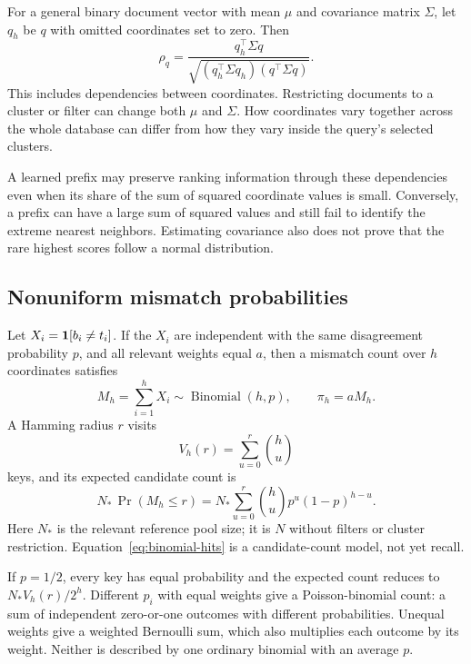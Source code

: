For a general binary document vector with mean $\mu$ and covariance matrix $\Sigma$, let
$q_h$ be $q$ with omitted coordinates set to zero. Then
\begin{equation}
\rho_q=\frac{q_h^\top\Sigma q}
 {\sqrt{(q_h^\top\Sigma q_h)(q^\top\Sigma q)}}.
\label{eq:rho-covariance}
\end{equation}
This includes dependencies between coordinates. Restricting documents to a cluster or filter can
change both $\mu$ and $\Sigma$. How coordinates vary together across the whole database can differ from how they vary
inside the query's selected clusters.

A learned prefix may preserve ranking information through these dependencies even when its
share of the sum of squared coordinate values is small. Conversely, a prefix can have a large sum of squared values and
still fail to identify the extreme nearest neighbors. Estimating covariance also does not
prove that the rare highest scores follow a normal distribution.

\subsection{Nonuniform mismatch probabilities}
Let $X_i=\mathbf 1[b_i\ne t_i]$. If the $X_i$ are independent with the same disagreement probability
$p$, and all relevant weights equal $a$, then a mismatch count over $h$ coordinates satisfies
\begin{equation}
M_h=\sum_{i=1}^{h}X_i\sim\operatorname{Binomial}(h,p),\qquad
\pi_h=aM_h.
\label{eq:binomial}
\end{equation}
A Hamming radius $r$ visits
\begin{equation}
V_h(r)=\sum_{u=0}^{r}\binom{h}{u}
\label{eq:hamming-volume}
\end{equation}
keys, and its expected candidate count is
\begin{equation}
N_*\,\Pr(M_h\leq r)
=N_*\sum_{u=0}^{r}\binom{h}{u}p^u(1-p)^{h-u}.
\label{eq:binomial-hits}
\end{equation}
Here $N_*$ is the relevant reference pool size; it is $N$ without filters or cluster restriction.
Equation~\eqref{eq:binomial-hits} is a candidate-count model, not yet recall.

If $p=1/2$, every key has equal probability and the expected count reduces to $N_*V_h(r)/2^h$.
Different $p_i$ with equal weights give a Poisson-binomial count: a sum of independent
zero-or-one outcomes with different probabilities. Unequal weights give a weighted Bernoulli sum,
which also multiplies each outcome by its weight. Neither is described by one ordinary binomial with an average $p$.

